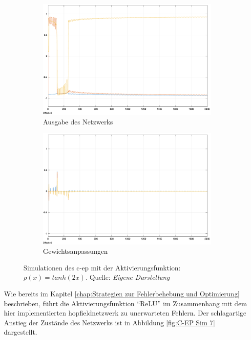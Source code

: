 \begin{figure}[h]
  \centering
  \begin{subfigure}[b]{0.5\textwidth}
    \includegraphics[width=\textwidth]{abbildungen/c_ep_sim_6_ausgabe.png}
    \caption{Ausgabe des Netzwerks}
  \end{subfigure}%
  \hfill
  \begin{subfigure}[b]{0.5\textwidth}
    \includegraphics[width=\textwidth]{abbildungen/c_ep_sim_6_weight_update.png}
    \caption{Gewichtsanpassungen}
  \end{subfigure}
  \caption{Simulationen des \gls{c-ep} mit der Aktivierungsfunktion: \(\rho(x)=tanh(2x)\). Quelle: \textit{Eigene Darstellung}}
  \label{fig:C-EP Sim 6}
\end{figure}

Wie bereits im Kapitel \ref{chap:Strategien zur Fehlerbehebung und Optimierung} beschrieben, führt die Aktivierungsfunktion "`ReLU"' im Zusammenhang mit dem hier implementierten \gls{hopfieldnetzwerk} zu unerwarteten Fehlern. Der schlagartige Anstieg der Zustände des Netzwerks ist in Abbildung \ref{fig:C-EP Sim 7} dargestellt.

